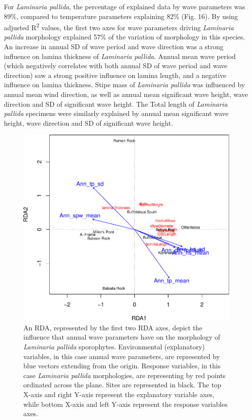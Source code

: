 \documentclass[10pt,a4,]{article}
\makeatletter
\def\maxwidth{\ifdim\Gin@nat@width>\linewidth\linewidth
\else\Gin@nat@width\fi}
\let\Oldincludegraphics\includegraphics
\renewcommand{\includegraphics}[1]{\Oldincludegraphics[width=\maxwidth]{#1}}
\makeatother
\begin{document}
For \emph{Laminaria pallida}, the percentage of explained data by wave
parameters was 89\%, compared to temperature parameters explaining 82\%
(Fig. 16). By using adjusted R\textsuperscript{2} values, the first two
axes for wave parameters driving \emph{Laminaria pallida} morphology
explained 57\% of the variation of morphology in this species. An
increase in annual SD of wave period and wave direction was a strong
influence on lamina thickness of \emph{Laminaria pallida}. Annual mean
wave period (which negatively correlates with both annual SD of wave
period and wave direction) saw a strong positive influence on lamina
length, and a negative influence on lamina thickness. Stipe mass of
\emph{Laminaria pallida} was influenced by annual mean wind direction,
as well as annual mean significant wave height, wave direction and SD of
significant wave height. The Total length of \emph{Laminaria pallida}
specimens were similarly explained by annual mean significant wave
height, wave direction and SD of significant wave height.

\begin{figure}
\centering
\includegraphics{chapter_2_files/figure-latex/unnamed-chunk-29-1.pdf}
\caption{An RDA, represented by the first two RDA axes, depict the
influence that annual wave parameters have on the morphology of
\emph{Laminaria pallida} sporophytes. Environmental (explanatory)
variables, in this case annual wave parameters, are represented by blue
vectors extending from the origin. Response variables, in this case
\emph{Laminaria pallida} morphologies, are representing by red points
ordinated across the plane. Sites are represented in black. The top
X-axis and right Y-axis represent the explanatory variable axes, while
bottom X-axis and left Y-axis represent the response variables axes.}
\end{figure}
\end{document}

